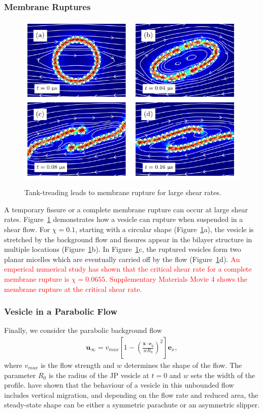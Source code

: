 \documentclass[lineno]{jfm}
\newcommand{\xx}{\mathbf{x}}
\newcommand{\uu}{\mathbf{u}}
\newcommand{\ReviewerOne}[1]{\textcolor{red}{#1}}
\begin{document}
\subsubsection{Membrane Ruptures}
\begin{figure}
\centering
\includegraphics[width=11.32cm]{Figure8_Wrapper.pdf}
\\
  \caption{\label{figure8} Tank-treading leads to membrane rupture for
  large shear rates.} 
\end{figure}
A temporary fissure or a complete membrane rupture can occur at large
shear rates. Figure~\ref{figure8} demonstrates how a vesicle can rupture
when suspended in a shear flow. For $\chi = 0.1$, starting with a
circular shape (Figure~\ref{figure8}a), the vesicle is stretched by the
background flow and fissures appear in the bilayer structure in multiple
locations (Figure~\ref{figure8}b). In Figure~\ref{figure8}c, the
ruptured vesicles form two planar micelles which are eventually carried
off by the flow (Figure~\ref{figure8}d). 
%
\ReviewerOne{An emperical numerical study has shown that the critical shear rate for a complete membrane rupture is $\chi=0.0655$. Supplementary Materials Movie 4 shows the membrane rupture at the critical shear rate.}




\subsubsection{Vesicle in a Parabolic Flow}
\label{sec:ves_in_parabolic}
Finally, we consider the parabolic background flow
\begin{align}
  \uu_\infty = v_{max}\left[ 1 - \left( 
    \frac{\xx \cdot \mathbf{e}_y}{wR_0}\right)^2
    \right]\mathbf{e}_x,
\end{align}
%
where $v_{max}$ is the flow strength and $w$ determines the shape of the
flow. The parameter $R_0$ is the radius of the JP vesicle at $t=0$ and
$w$ sets the width of the profile. \cite{Kaoui09, cou-kao-pod-mis2008,
dan-vla-mis2009} have shown that the behaviour of a vesicle in this
unbounded flow includes vertical migration, and depending on the flow
rate and reduced area, the steady-state shape can be either a symmetric
parachute or an asymmetric slipper.
\end{document}
